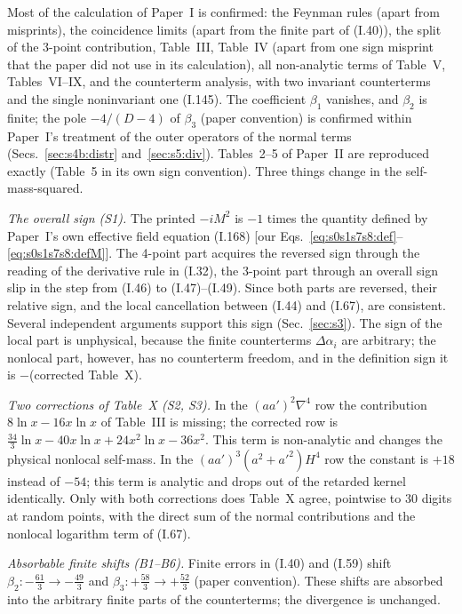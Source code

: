 \documentclass[aps,prd,onecolumn,10pt,nofootinbib,floatfix]{revtex4-2}
\newcommand{\eqI}[1]{(I.#1)}
\begin{document}
Most of the calculation of Paper~I is confirmed: the Feynman rules (apart from misprints), the coincidence limits (apart from the
finite part of \eqI{40}), the split of the
3-point contribution, Table~III, Table~IV (apart from one sign misprint that the paper did not use in its calculation), all non-analytic
terms of Table~V, Tables~VI--IX, and the counterterm analysis, with two invariant counterterms and the single noninvariant one
\eqI{145}. The coefficient $\beta_1$ vanishes, and $\beta_2$ is finite; the pole $-4/(D-4)$ of $\beta_3$ (paper convention) is
confirmed within Paper~I's treatment of the outer operators of the normal terms (Secs.~\ref{sec:s4b:distr} and~\ref{sec:s5:div}).
Tables~2--5 of Paper~II are reproduced exactly (Table~5 in its own sign convention). Three things change in the self-mass-squared.

\emph{The overall sign (S1).} The printed $-iM^2$ is $-1$ times the quantity defined by Paper~I's own effective field equation \eqI{168}
[our Eqs.~\eqref{eq:s0s1s7s8:def}--\eqref{eq:s0s1s7s8:defM}]. The
4-point part acquires the reversed sign through the reading of the derivative rule in \eqI{32}, the 3-point part through an overall
sign slip in the step from \eqI{46} to \eqI{47}--\eqI{49}. Since both parts are reversed, their relative sign, and the local
cancellation between \eqI{44} and \eqI{67}, are consistent. Several independent arguments support this sign
(Sec.~\ref{sec:s3}). The sign of the local part is unphysical, because the finite counterterms
$\Delta\alpha_i$ are arbitrary; the nonlocal part, however, has no counterterm freedom, and in the definition sign it is $-$(corrected
Table~X).

\emph{Two corrections of Table~X (S2, S3).} In the $(aa')^2\nabla^4$ row the contribution $8\ln x-16x\ln x$ of Table~III is missing; the
corrected row is $\tfrac{34}{3}\ln x-40x\ln x+24x^2\ln x-36x^2$. This term is non-analytic and changes the physical nonlocal
self-mass. In the $(aa')^3(a^2+a'^2)H^4$ row the constant is $+18$ instead of $-54$; this term is analytic and drops out of the retarded
kernel identically. Only with both corrections does Table~X agree, pointwise to 30 digits at random points, with the direct sum of
the normal contributions and the nonlocal logarithm term of \eqI{67}.

\emph{Absorbable finite shifts (B1--B6).} Finite errors in \eqI{40} and \eqI{59} shift $\beta_2:-\tfrac{61}{3}\to-\tfrac{49}{3}$ and
$\beta_3:+\tfrac{58}{3}\to+\tfrac{52}{3}$ (paper convention). These shifts are absorbed into the arbitrary finite parts of the
counterterms; the divergence is unchanged.
\end{document}
